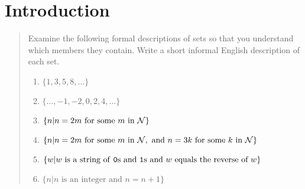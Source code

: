 \chapter{Introduction}

\begin{quote}
Examine the following formal descriptions of sets so that you understand which
members they contain.
Write a short informal English description of each set.
\begin{enumerate}[label=\alph*.]
    \item $\{1, 3, 5, 8, \dots\}$
    \item $\{\dots, -1, -2, 0, 2, 4, \dots\}$
    \item $\{n | n = 2m \text{ for some } m \text{ in } \mathcal{N}\}$
    \item $\{n |
        n = 2m \text{ for some } m \text{ in } \mathcal{N},
        \text{ and } n = 3k \text{ for some } k \text{ in } \mathcal{N}
        \}$
    \item $\{w | w \text{ is a string of \texttt{0}s and \texttt{1}s and } w \text{ equals the reverse of } w\}$
    \item $\{n | n \text{ is an integer and } n = n + 1\}$
\end{enumerate}
\end{quote}
